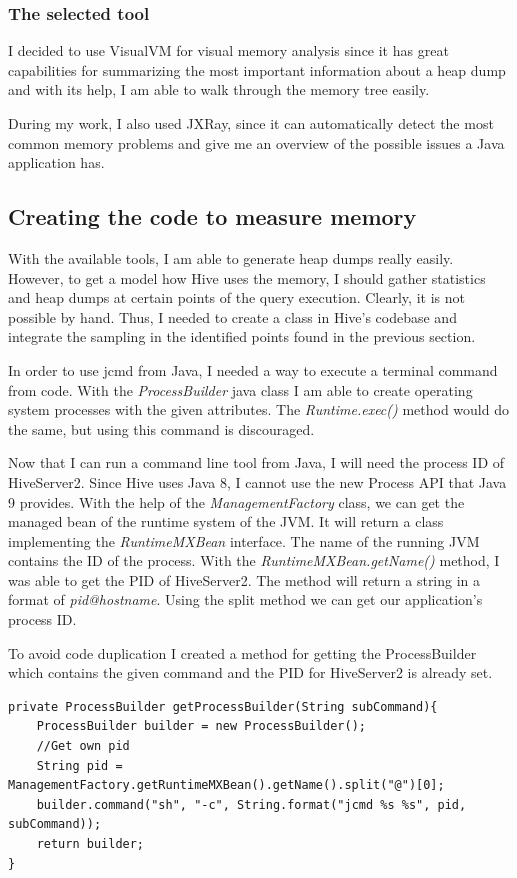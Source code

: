 \subsubsection{The selected tool}
I decided to use VisualVM for visual memory analysis since it has great capabilities for summarizing the most important information about a heap dump and with its help, I am able to walk through the memory tree easily.

During my work, I also used JXRay, since it can automatically detect the most common memory problems and give me an overview of the possible issues a Java application has.

\clearpage
\subsection{Creating the code to measure memory}
With the available tools, I am able to generate heap dumps really easily. However, to get a model how Hive uses the memory, I should gather statistics and heap dumps at certain points of the query execution. Clearly, it is not possible by hand. Thus, I needed to create a class in Hive's codebase and integrate the sampling in the identified points found in the previous section.

In order to use jcmd from Java, I needed a way to execute a terminal command from code. With the \textit{ProcessBuilder} java class I am able to create operating system processes with the given attributes. The \textit{Runtime.exec()} method would do the same, but using this command is discouraged. 

Now that I can run a command line tool from Java, I will need the process ID of HiveServer2. Since Hive uses Java 8, I cannot use the new Process API that Java 9 provides. With the help of the \textit{ManagementFactory} class, we can get the managed bean of the runtime system of the JVM. It will return a class implementing the \textit{RuntimeMXBean} interface. The name of the running JVM contains the ID of the process. With the \textit{RuntimeMXBean.getName()} method, I was able to get the PID of HiveServer2. The method will return a string in a format of \textit{pid@hostname}. Using the split method we can get our application's process ID.

To avoid code duplication I created a method for getting the ProcessBuilder which contains the given command and the PID for HiveServer2 is already set.

\begin{lstlisting}
private ProcessBuilder getProcessBuilder(String subCommand){
	ProcessBuilder builder = new ProcessBuilder();
	//Get own pid
	String pid = ManagementFactory.getRuntimeMXBean().getName().split("@")[0];
	builder.command("sh", "-c", String.format("jcmd %s %s", pid, subCommand));
	return builder;
}
\end{lstlisting}

